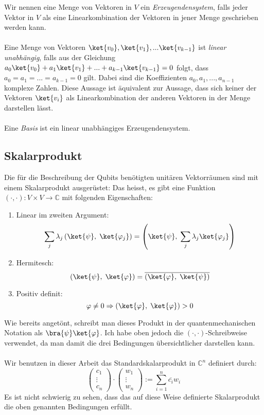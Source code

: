 Wir nennen eine Menge von Vektoren in $V$ ein \textit{Erzeugendensystem}, falls jeder Vektor in $V$ als eine Linearkombination der Vektoren in jener Menge geschrieben werden kann. 
\paragraph{}
Eine Menge von Vektoren $\ket{v_0}, \ket{v_1}, ... \ket{v_{k - 1}}$ ist \textit{linear unabhängig}, falls aus der Gleichung $a_0\ket{v_0} + a_1\ket{v_1} + ... + a_{k - 1}\ket{v_{k - 1}} = 0$ folgt, dass $a_0 = a_1 = ... = a_{k - 1} = 0$ gilt. Dabei sind die Koeffizienten $a_0, a_1, ..., a_{n - 1}$ komplexe Zahlen. Diese Aussage ist äquivalent zur Aussage, dass sich keiner der Vektoren $\ket{v_{i}}$ als Linearkombination der anderen Vektoren in der Menge darstellen lässt.

\paragraph{}
Eine \textit{Basis} ist ein linear unabhängiges Erzeugendensystem.

\subsection{Skalarprodukt}
Die für die Beschreibung der Qubits benötigten unitären Vektorräumen sind mit einem Skalarprodukt ausgerüstet: Das heisst, es gibt eine Funktion $(\cdot, \cdot) : V \times V \rightarrow \mathbb{C}$ mit folgenden Eigenschaften:
\begin{enumerate}
    \item Linear im zweiten Argument: $$\sum_j\lambda_j\left(\ket{\psi}, \; \ket{\varphi_j}\right) = \left(\ket{\psi}, \; \sum_j\lambda_j\ket{\varphi_j}\right)$$
    \item Hermitesch: $$\left(\ket{\psi}, \; \ket{\varphi} \right) = \overline{\left(\ket{\varphi} , \; \ket{\psi}\right)}$$
    \item Positiv definit: $$\varphi \neq 0 \Rightarrow \left( \ket{\varphi}, \; \ket{\varphi} \right) > 0$$
\end{enumerate}
Wie bereits angetönt, schreibt man dieses Produkt in der quantenmechanischen Notation als $\bra{\psi}\ket{\varphi}$. Ich habe oben jedoch die $(\cdot, \cdot)$-Schreibweise verwendet, da man damit die drei Bedingungen übersichtlicher darstellen kann.
\paragraph{}
\noindent Wir benutzen in dieser Arbeit das Standardskalarprodukt in $\mathbb{C}^n$ definiert durch: $$\begin{pmatrix} c_1 \\ \vdots \\ c_n \end{pmatrix}\cdot\begin{pmatrix} w_1 \\ \vdots \\ w_n \end{pmatrix} := \sum_{i = 1}^{n}\overline{c_i}w_i$$
\noindent Es ist nicht schwierig zu sehen, dass das auf diese Weise definierte Skalarprodukt die oben genannten Bedingungen erfüllt.

